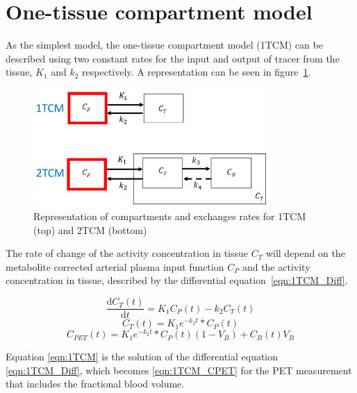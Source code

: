 \section{One-tissue compartment model}
As the simplest model, the one-tissue compartment model (1TCM) can be described using two constant rates for the input and output of tracer from the tissue, $K_1$ and $k_2$ respectively. A representation can be seen in figure~\ref{fig:1_2TCM}.

\begin{figure}[ht]
	\includegraphics[width=0.8\textwidth]{2_Theory_Methods/figures/TissueCompartmentModels.pdf}
	\centering
	\caption{Representation of compartments and exchanges rates for 1TCM (top) and 2TCM (bottom)}
	\centering
	\label{fig:1_2TCM}
\end{figure}

The rate of change of the activity concentration in tissue $C_T$ will depend on the metabolite corrected arterial plasma input function $C_P$ and the activity concentration in tissue, described by the differential equation~\ref{eqn:1TCM_Diff}.

\begin{equation}
  \frac{\mathrm d C_T(t)}{\mathrm d t} = K_1 C_P(t) - k_2 C_T(t)
  \label{eqn:1TCM_Diff}
\end{equation}
\begin{equation}
   C_T(t) = K_1 e^{-k_2 t} \ast C_P(t) 
  \label{eqn:1TCM}
\end{equation}
\begin{equation}
   C_{PET}(t) =   K_1 e^{-k_2 t} \ast C_P(t) (1-V_B) + C_B(t) V_B
  \label{eqn:1TCM_CPET}
\end{equation}

Equation \ref{eqn:1TCM} is the solution of the differential equation \ref{eqn:1TCM_Diff}, which becomes \ref{eqn:1TCM_CPET} for the PET measurement that includes the fractional blood volume. %

